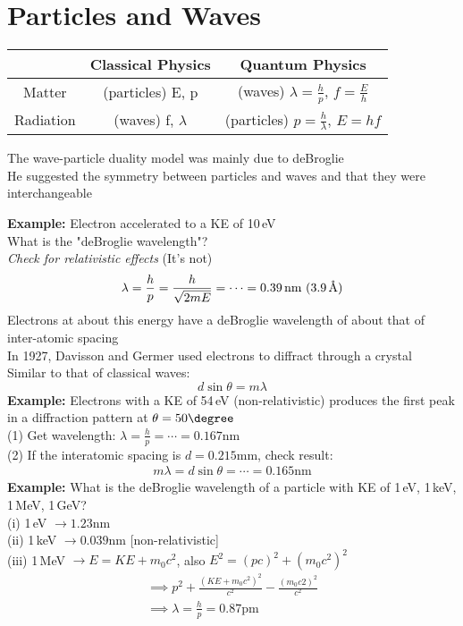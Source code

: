 \documentclass[a4paper, 11pt, fleqn, normalem]{report}
\begin{document}
\section{Particles and Waves}
\begin{tabular}{c|c|c}
              & Classical Physics    & Quantum Physics \\
    \hline
    Matter    & (particles) E, p     & (waves) $\lambda = \frac{h}{p}$, $f = \frac{E}{h}$                    \\
    \hline
    Radiation & (waves) f, $\lambda$ & (particles) $p = \frac{h}{\lambda}$, $E = hf$
\end{tabular}
The wave-particle duality model was mainly due to deBroglie \\
He suggested the symmetry between particles and waves and that they were interchangeable

\textbf{Example: }Electron accelerated to a KE of 10\,eV \\
What is the "deBroglie wavelength"? \\
\emph{Check for relativistic effects} (It's not)
\begin{equation*}
    \lambda = \frac{h}{p} = \frac{h}{\sqrt{2mE}} = \cdots = 0.39\,\text{nm}~(3.9\,\text{\r{A}})
\end{equation*}
Electrons at about this energy have a deBroglie wavelength of about that of inter-atomic spacing \\
In 1927, Davisson and Germer used electrons to diffract through a crystal \\
Similar to that of classical waves:
\begin{equation*}
    d\sin{\theta} = m\lambda
\end{equation*}
\textbf{Example: }Electrons with a KE of 54\,eV (non-relativistic) produces the first peak in a diffraction pattern at $\theta = 50\degree$ \\
(1) Get wavelength: $\lambda = \frac{h}{p} = \cdots = 0.167$nm \\
(2) If the interatomic spacing is $d = 0.215$mm, check result:
\begin{gather*}
    m\lambda = d\sin{\theta} = \cdots = 0.165\text{nm}
\end{gather*}
\textbf{Example: }What is the deBroglie wavelength of a particle with KE of 1\,eV, 1\,keV, 1\,MeV, 1\,GeV? \\
(i) 1\,eV $\rightarrow 1.23$nm \\
(ii) 1\,keV $\rightarrow 0.039$nm [non-relativistic] \\
(iii) 1\,MeV $\rightarrow E = KE + m_{0}c^{2}$, also $E^{2} = (pc)^{2} + (m_{0}c^{2})^{2}$
\begin{gather*}
    \implies p^{2} + \frac{(KE + m_{0}c^{2})^{2}}{c^{2}} - \frac{(m_{0}c{2})^{2}}{c^{2}} \\
    \implies \lambda = \frac{h}{p} = 0.87\text{pm}
\end{gather*}
\end{document}
